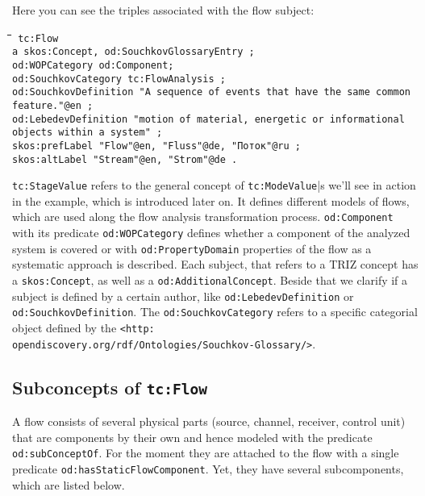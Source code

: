 \documentclass[a4paper,11pt]{article}
\newenvironment{code}{\tt \begin{tabbing}
\hskip12pt\=\hskip12pt\=\hskip12pt\=\hskip12pt\=\hskip5cm\=\hskip5cm\=\kill}
{\end{tabbing}}
\begin{document}
    Here you can see the triples associated with the flow subject:
    \begin{code}\tt
    tc:Flow \\
    \> a skos:Concept, od:SouchkovGlossaryEntry ; \\
    \> od:WOPCategory od:Component; \\
    \> od:SouchkovCategory tc:FlowAnalysis ; \\
    \> od:SouchkovDefinition "A sequence of events that have the same common \\
    \> feature."@en ; \\
    \> od:LebedevDefinition "motion of material, energetic or informational \\
    \> objects within a system" ; \\
    \> skos:prefLabel "Flow"@en, "Fluss"@de, "Поток"@ru ; \\
    \> skos:altLabel "Stream"@en, "Strom"@de . \\
    \end{code}

    \texttt{tc:StageValue} refers to the general concept of \texttt{tc:ModeValue}|s 
    we'll see in action in the example, which is introduced later on. It defines
    different models of flows, which are used along the flow analysis 
    transformation process. \texttt{od:Component} with its predicate
    \texttt{od:WOPCategory} defines whether a component of the analyzed system
    is covered or with \texttt{od:PropertyDomain} properties of the flow as a
    systematic approach is described. Each subject, that refers to a TRIZ 
    concept has a \texttt{skos:Concept}, as well as a 
    \texttt{od:AdditionalConcept}. Beside that we clarify if a subject is defined
    by a certain author, like \texttt{od:LebedevDefinition} or \newline
    \texttt{od:SouchkovDefinition}. The \texttt{od:SouchkovCategory} refers to a
    specific categorial object defined by the
    \texttt{<http:\\opendiscovery.org/rdf/Ontologies/Souchkov-Glossary/>}.

    \subsection{Subconcepts of \texttt{tc:Flow}}

    A flow consists of several physical parts (source, channel, receiver, 
    control unit) that are components by their own and hence modeled with the 
    predicate \texttt{od:subConceptOf}. For the moment they are attached to the
    flow with a single predicate \texttt{od:hasStaticFlowComponent}. Yet, they 
    have several subcomponents, which are listed below.
\end{document}
